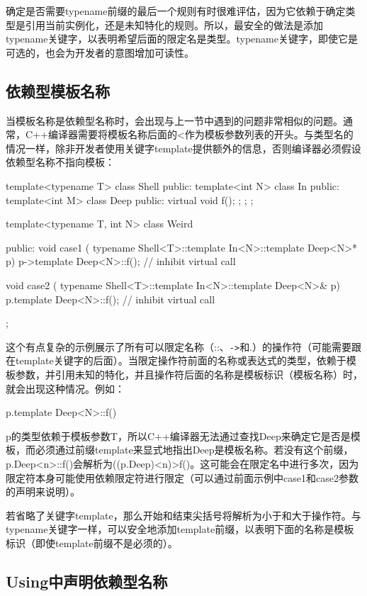 确定是否需要typename前缀的最后一个规则有时很难评估，因为它依赖于确定类型是引用当前实例化，还是未知特化的规则。所以，最安全的做法是添加typename关键字，以表明希望后面的限定名是类型。typename关键字，即使它是可选的，也会为开发者的意图增加可读性。

\subsection{依赖型模板名称}

当模板名称是依赖型名称时，会出现与上一节中遇到的问题非常相似的问题。通常，C++编译器需要将模板名称后面的<作为模板参数列表的开头。与类型名的情况一样，除非开发者使用关键字template提供额外的信息，否则编译器必须假设依赖型名称不指向模板：

\begin{cpp}
template<typename T>
class Shell {
	public:
	template<int N>
	class In {
		public:
		template<int M>
		class Deep {
			public:
			virtual void f();
		};
	};
};

template<typename T, int N>
class Weird {
public:
	void case1 (
	typename Shell<T>::template In<N>::template Deep<N>* p) {
		p->template Deep<N>::f(); // inhibit virtual call
	}

	void case2 (
	typename Shell<T>::template In<N>::template Deep<N>& p) {
		p.template Deep<N>::f(); // inhibit virtual call
	}
};
\end{cpp}

这个有点复杂的示例展示了所有可以限定名称（::、\texttt{->}和.）的操作符（可能需要跟在template关键字的后面）。当限定操作符前面的名称或表达式的类型，依赖于模板参数，并引用未知的特化，并且操作符后面的名称是模板标识（模板名称）时，就会出现这种情况。例如：

\begin{cpp}
p.template Deep<N>::f()
\end{cpp}

p的类型依赖于模板参数T，所以C++编译器无法通过查找Deep来确定它是否是模板，而必须通过前缀template来显式地指出Deep是模板名称。若没有这个前缀，p.Deep<n>::f()会解析为((p.Deep)<n)>f()。这可能会在限定名中进行多次，因为限定符本身可能使用依赖限定符进行限定（可以通过前面示例中case1和case2参数的声明来说明）。

若省略了关键字template，那么开始和结束尖括号将解析为小于和大于操作符。与typename关键字一样，可以安全地添加template前缀，以表明下面的名称是模板标识（即使template前缀不是必须的）。

\subsection{Using中声明依赖型名称}

